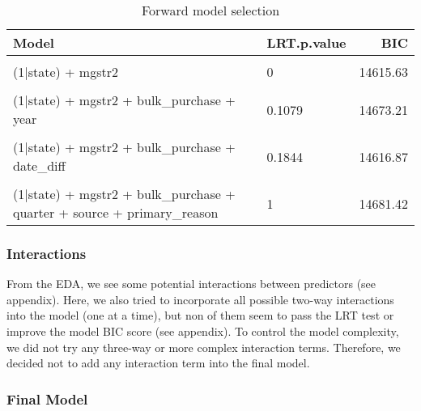 \documentclass[
  11pt,
]{article}
\begin{document}
\begin{table}[!h]

\caption{\label{tab:unnamed-chunk-24}Forward model selection}
\centering
\begin{tabular}[t]{l|l|r}
\hline
Model & LRT.p.value & BIC\\
\hline
\cellcolor{gray!6}{(1|state)} & \cellcolor{gray!6}{} & \cellcolor{gray!6}{15374.76}\\
\hline
(1|state) + mgstr2 & 0 & 14615.63\\
\hline
\cellcolor{gray!6}{(1|state) + mgstr2 + bulk\_purchase} & \cellcolor{gray!6}{2e-04} & \cellcolor{gray!6}{14610.01}\\
\hline
(1|state) + mgstr2 + bulk\_purchase + year & 0.1079 & 14673.21\\
\hline
\cellcolor{gray!6}{(1|state) + mgstr2 + bulk\_purchase + quarter} & \cellcolor{gray!6}{0.0213} & \cellcolor{gray!6}{14626.19}\\
\hline
(1|state) + mgstr2 + bulk\_purchase + date\_diff & 0.1844 & 14616.87\\
\hline
\cellcolor{gray!6}{(1|state) + mgstr2 + bulk\_purchase + quarter + source} & \cellcolor{gray!6}{7e-04} & \cellcolor{gray!6}{14641.45}\\
\hline
(1|state) + mgstr2 + bulk\_purchase + quarter + source + primary\_reason & 1 & 14681.42\\
\hline
\end{tabular}
\end{table}

\hypertarget{interactions}{%
\subsubsection{Interactions}\label{interactions}}

From the EDA, we see some potential interactions between predictors (see
appendix). Here, we also tried to incorporate all possible two-way
interactions into the model (one at a time), but non of them seem to
pass the LRT test or improve the model BIC score (see appendix). To
control the model complexity, we did not try any three-way or more
complex interaction terms. Therefore, we decided not to add any
interaction term into the final model.

\hypertarget{final-model}{%
\subsubsection{Final Model}\label{final-model}}
\end{document}
